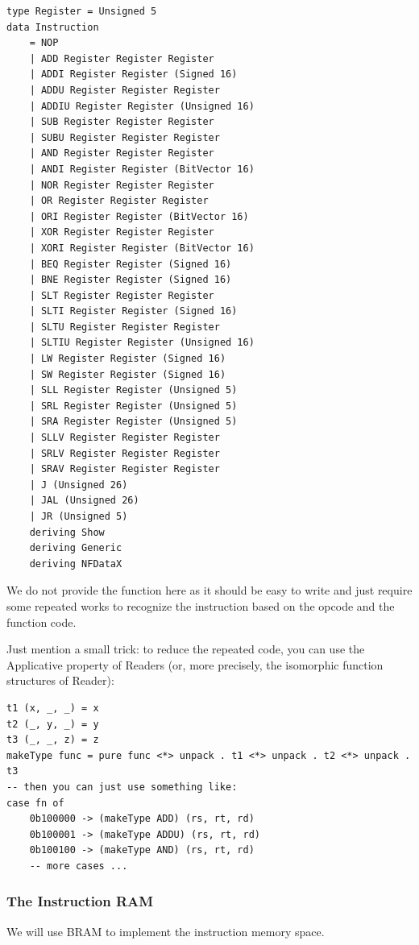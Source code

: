 \documentclass[a4paper,12pt, oneside]{book}
\begin{document}
\begin{verbatim}
type Register = Unsigned 5
data Instruction
    = NOP
    | ADD Register Register Register
    | ADDI Register Register (Signed 16)
    | ADDU Register Register Register
    | ADDIU Register Register (Unsigned 16)
    | SUB Register Register Register
    | SUBU Register Register Register
    | AND Register Register Register
    | ANDI Register Register (BitVector 16)
    | NOR Register Register Register
    | OR Register Register Register
    | ORI Register Register (BitVector 16)
    | XOR Register Register Register
    | XORI Register Register (BitVector 16)
    | BEQ Register Register (Signed 16)
    | BNE Register Register (Signed 16)
    | SLT Register Register Register
    | SLTI Register Register (Signed 16)
    | SLTU Register Register Register
    | SLTIU Register Register (Unsigned 16)
    | LW Register Register (Signed 16)
    | SW Register Register (Signed 16)
    | SLL Register Register (Unsigned 5)
    | SRL Register Register (Unsigned 5)
    | SRA Register Register (Unsigned 5)
    | SLLV Register Register Register
    | SRLV Register Register Register
    | SRAV Register Register Register
    | J (Unsigned 26)
    | JAL (Unsigned 26)
    | JR (Unsigned 5)
    deriving Show
    deriving Generic
    deriving NFDataX
\end{verbatim}
We do not provide the function  here as it should be easy to write and just require some repeated works to recognize the instruction based on the opcode and the function code.

Just mention a small trick: to reduce the repeated code, you can use the Applicative property of Readers (or, more precisely, the isomorphic function structures of Reader):
\begin{verbatim}
t1 (x, _, _) = x
t2 (_, y, _) = y
t3 (_, _, z) = z
makeType func = pure func <*> unpack . t1 <*> unpack . t2 <*> unpack . t3
-- then you can just use something like:
case fn of
    0b100000 -> (makeType ADD) (rs, rt, rd)
    0b100001 -> (makeType ADDU) (rs, rt, rd)
    0b100100 -> (makeType AND) (rs, rt, rd)
    -- more cases ...
\end{verbatim}

\subsubsection{The Instruction RAM}
We will use BRAM to implement the instruction memory space. 
\end{document}
